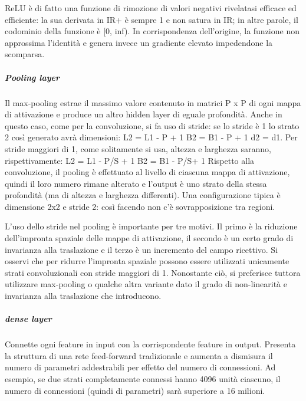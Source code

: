 \documentclass[14pt]{extarticle}
\begin{document}
ReLU è di fatto una funzione di rimozione di valori negativi rivelatasi efficace ed efficiente: la sua derivata in IR+ è sempre 1 e non satura in IR; in altre parole, il codominio
della funzione è [0, inf). In corrispondenza dell’origine, la funzione non approssima
l’identità e genera invece un gradiente elevato impedendone la scomparsa. \cite{aghdam2017guide}
\subparagraph{Pooling layer}
Il max-pooling estrae il massimo valore contenuto in matrici P x P di ogni mappa di
attivazione e produce un altro hidden layer di eguale profondità. Anche in questo caso,
come per la convoluzione, si fa uso di stride: se lo stride è 1 lo strato 2 così generato
avrà dimensioni:
L2 = L1 - P + 1
B2 = B1 - P + 1
d2 = d1.
Per stride maggiori di 1, come solitamente si usa, altezza e larghezza saranno, rispettivamente:
L2 = L1 - P/S + 1
B2 = B1 - P/S+ 1
Rispetto alla convoluzione, il pooling è effettuato al livello di ciascuna mappa di attivazione, quindi il loro numero rimane alterato e l’output è uno strato della stessa profondità (ma di altezza e larghezza differenti). Una configurazione tipica è dimensione
2x2 e stride 2: così facendo non c’è sovrapposizione tra regioni.

L’uso dello stride nel pooling è importante per tre motivi. Il primo è la riduzione
dell’impronta spaziale delle mappe di attivazione, il secondo è un certo grado di invarianza alla traslazione e il terzo è un incremento del campo ricettivo. Si osservi che per
ridurre l’impronta spaziale possono essere utilizzati unicamente strati convoluzionali
con stride maggiori di 1. Nonostante ciò, si preferisce tuttora utilizzare max-pooling o
qualche altra variante dato il grado di non-linearità e invarianza alla traslazione che
introducono.\cite{aggarwal2018neural}
\subparagraph{dense layer}
Connette ogni feature in input con la corrispondente feature in output. Presenta la struttura di una rete feed-forward tradizionale e aumenta a dismisura il numero di parametri
addestrabili per effetto del numero di connessioni. Ad esempio, se due strati completamente connessi hanno 4096 unità ciascuno, il numero di connessioni (quindi di
parametri) sarà superiore a 16 milioni. \cite{aggarwal2018neural}
\end{document}
